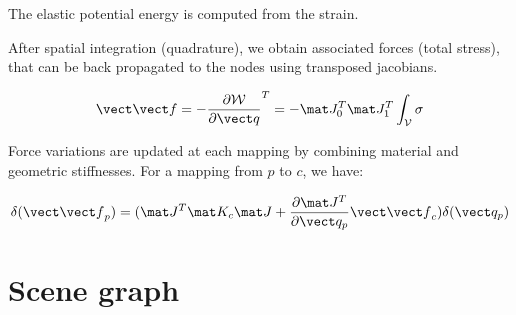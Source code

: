 The elastic potential energy is computed from the strain. 

After spatial integration (quadrature), we obtain associated forces (total stress), that can be back propagated to the nodes using transposed jacobians.

\begin{equation}\label{eq:f}
 \vfdof = - \frac{\partial \W}{\partial \vdof}^T =  - \Jt_0\Jt_1 \int_{\volume} \stress
\end{equation}

Force variations are updated at each mapping by combining material and geometric stiffnesses. For a mapping from $p$ to $c$, we have:

\begin{equation}
 \delta(\vfdof_p) = ( \Jt \K_c \J + \frac{\partial \Jt}{\partial \vdof_p} \vfdof_c ) \delta(\vdof_p) 
\end{equation}

\newpage
\section{Scene graph}

